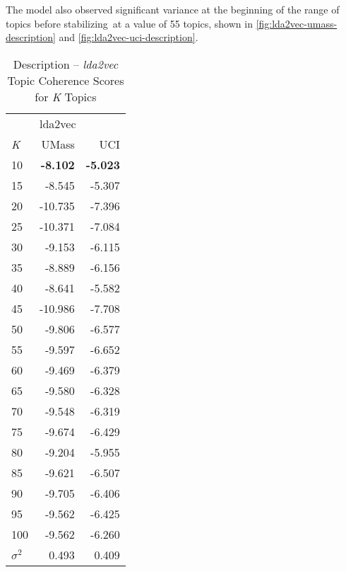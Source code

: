 \documentclass[letterpaper,12pt]{article}
\begin{document}
The model also observed significant variance at the beginning of the range of topics before stabilizing\
at a value of 55 topics, shown in \ref{fig:lda2vec-umass-description} and \ref{fig:lda2vec-uci-description}.
\begin{table}
	\caption{\label{tab:lda2vec_description_tc} Description -- \emph{lda2vec} Topic Coherence Scores for \emph{K} Topics}
	\begin{center}
		\begin{tabular}{lrr}
			\toprule
				{} & \multicolumn{2}{l}{lda2vec} \\
				\emph{K} &   UMass &    UCI \\
				\midrule
				10  &  \textbf{-8.102} & \textbf{-5.023} \\
				15  &  -8.545 & -5.307 \\
				20  & -10.735 & -7.396 \\
				25  & -10.371 & -7.084 \\
				30  &  -9.153 & -6.115 \\
				35  &  -8.889 & -6.156 \\
				40  &  -8.641 & -5.582 \\
				45  & -10.986 & -7.708 \\
				50  &  -9.806 & -6.577 \\
				55  &  -9.597 & -6.652 \\
				60  &  -9.469 & -6.379 \\
				65  &  -9.580 & -6.328 \\
				70  &  -9.548 & -6.319 \\
				75  &  -9.674 & -6.429 \\
				80  &  -9.204 & -5.955 \\
				85  &  -9.621 & -6.507 \\
				90  &  -9.705 & -6.406 \\
				95  &  -9.562 & -6.425 \\
				100 &  -9.562 & -6.260 \\
			\midrule
			$\sigma^2$ & 0.493 & 0.409 \\
			\bottomrule
		\end{tabular}
	\end{center}
\end{table}


\end{document}
